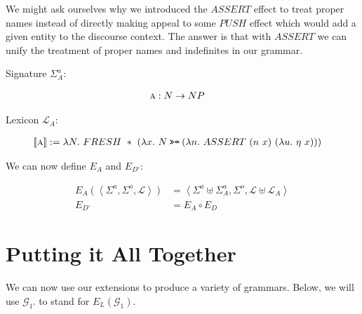 \documentclass{article}
\newcommand{\hsbind}{\mathbin{\texttt{>>=}}}
\newcommand{\abs}[1]{\textsc{#1}}
\newcommand{\sem}[1]{\llbracket #1 \rrbracket}
\newcommand{\lex}[2]{\sem{\abs{#1}} &:= #2}
\begin{document}
We might ask ourselves why we introduced the $ASSERT$ effect to treat
proper names instead of directly making appeal to some $PUSH$ effect which
would add a given entity to the discourse context. The answer is that with
$ASSERT$ we can unify the treatment of proper names and indefinites in our
grammar.

Signature $\Sigma^a_A$:

\begin{align*}
  \abs{a} &: N \to NP
\end{align*}

Lexicon $\mathcal{L}_A$:

\begin{align*}
  \lex{a}{\lambda N.\ FRESH\ *\ (\lambda x.\ N \hsbind (\lambda n.\ ASSERT\ (n\ x)\ (\lambda u.\ \eta\ x)))}
\end{align*}

We can now define $E_A$ and $E_{D'}$:

\begin{align*}
E_A(\left< \Sigma^a, \Sigma^o, \mathcal{L} \right>) &= \left< \Sigma^a \uplus \Sigma^a_A, \Sigma^o, \mathcal{L} \uplus \mathcal{L}_A \right> \\
E_{D'} &= E_A \circ E_D
\end{align*}



\section{Putting it All Together}

We can now use our extensions to produce a variety of grammars. Below, we
will use $\mathcal{G}_{1'}$ to stand for $E_L(\mathcal{G}_1)$.
\end{document}
